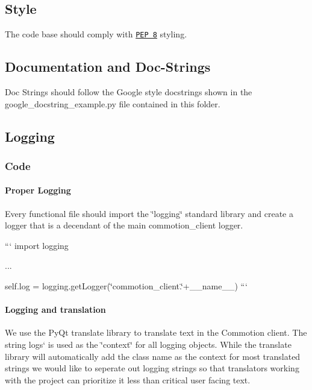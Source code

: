 \subsection*{Style}

The code base should comply with \href{http://legacy.python.org/dev/peps/pep-0008/}{\tt P\-E\-P 8} styling.

\subsection*{Documentation and Doc-\/\-Strings}

Doc Strings should follow the Google style docstrings shown in the google\-\_\-docstring\-\_\-example.\-py file contained in this folder.

\subsection*{Logging}

\subsubsection*{Code}

\paragraph*{Proper Logging}

Every functional file should import the \char`\"{}logging\char`\"{} standard library and create a logger that is a decendant of the main commotion\-\_\-client logger.

``` import logging

...

self.\-log = logging.\-get\-Logger(\char`\"{}commotion\-\_\-client.\char`\"{}+\-\_\-\-\_\-name\-\_\-\-\_\-) ```

\paragraph*{Logging and translation}

We use the Py\-Qt translate library to translate text in the Commotion client. The string {\ttfamily logs}` is used as the \char`\"{}context\char`\"{} for all logging objects. While the translate library will automatically add the class name as the context for most translated strings we would like to seperate out logging strings so that translators working with the project can prioritize it less than critical user facing text.

